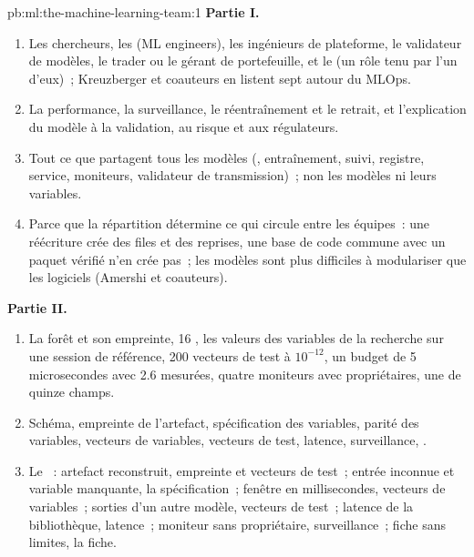 \begin{solution}{pb:ml:the-machine-learning-team:1}
\textbf{Partie I.}
\begin{enumerate}
\item Les chercheurs, les  (ML engineers), les ingénieurs de plateforme, le validateur de modèles, le trader ou le gérant de portefeuille, et le
 (un rôle tenu par l'un d'eux)~; Kreuzberger et coauteurs en listent sept autour du MLOps.
\item La performance, la surveillance, le réentraînement et le retrait, et l'explication du modèle à la validation, au risque et aux régulateurs.
\item Tout ce que partagent tous les modèles (, entraînement, suivi, registre, service, moniteurs, validateur de transmission)~; non les
modèles ni leurs variables.
\item Parce que la répartition détermine ce qui circule entre les équipes~: une réécriture crée des files et des reprises, une base de code commune avec un
paquet vérifié n'en crée pas~; les modèles sont plus difficiles à modulariser que les logiciels (Amershi et coauteurs).
\end{enumerate}
\textbf{Partie II.}
\begin{enumerate}[resume]
\item La forêt et son empreinte, 16 , les valeurs des variables de la recherche sur une session de référence, 200 vecteurs de test à
$10^{-12}$, un budget de 5 microsecondes avec 2.6 mesurées, quatre moniteurs avec propriétaires, une  de quinze champs.
\item Schéma, empreinte de l'artefact, spécification des variables, parité des variables, vecteurs de variables, vecteurs de test, latence, surveillance, .
\item Le ~: artefact reconstruit, empreinte et vecteurs de test~; entrée inconnue et variable manquante, la spécification~;
fenêtre en millisecondes, vecteurs de variables~; sorties d'un autre modèle, vecteurs de test~; latence de la bibliothèque, latence~; moniteur sans propriétaire,
surveillance~; fiche sans limites, la fiche.

\end{enumerate}
\end{solution}
